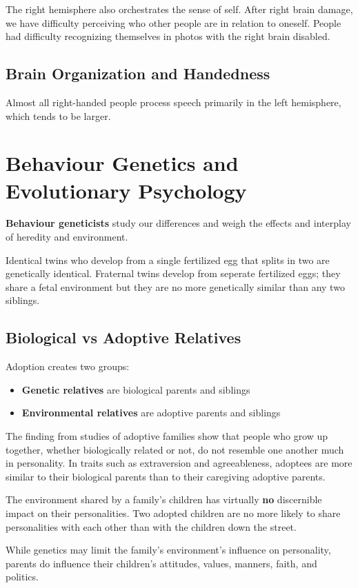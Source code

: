 \documentclass[12pt]{article}
\begin{document}
The right hemisphere also orchestrates the sense of self. After right brain damage, we have difficulty perceiving who other people are in relation to oneself. People had difficulty recognizing themselves in photos with the right brain disabled.

\subsection*{Brain Organization and Handedness}
Almost all right-handed people process speech primarily in the left hemisphere, which tends to be larger. 

\section*{Behaviour Genetics and Evolutionary Psychology}
\textbf{Behaviour geneticists} study our differences and weigh the effects and interplay of heredity and environment.

Identical twins who develop from a single fertilized egg that splits in two are genetically identical. Fraternal twins develop from seperate fertilized eggs; they share a fetal environment but they are no more genetically similar than any two siblings.

\subsection*{Biological vs Adoptive Relatives}
Adoption creates two groups:
\begin{itemize}
\item {\bf Genetic relatives} are biological parents and siblings
\item {\bf Environmental relatives} are adoptive parents and siblings
\end{itemize}

The finding from studies of adoptive families show that people who grow up together, whether biologically related or not, do not resemble one another much in personality.  In traits such as extraversion and agreeableness, adoptees are more similar to their biological parents than to their caregiving adoptive parents.

The environment shared by a family's children has virtually \textbf{no} discernible impact on their personalities. Two adopted children are no more likely to share personalities with each other than with the children down the street.

While genetics may limit the family's environment's influence on personality, parents do influence their children's attitudes, values, manners, faith, and politics.
\end{document}
